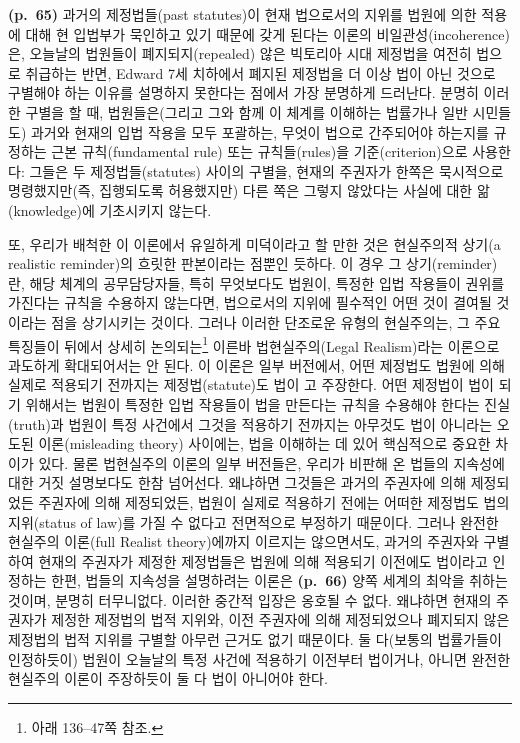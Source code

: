 \textbf{(p.~65)} 과거의 제정법들(past statutes)이 현재 법으로서의 지위를
법원에 의한 적용에 대해 현 입법부가 묵인하고 있기 때문에 갖게 된다는
이론의 비일관성(incoherence)은, 오늘날의 법원들이 폐지되지(repealed)
않은 빅토리아 시대 제정법을 여전히 법으로 취급하는 반면, Edward 7세
치하에서 폐지된 제정법을 더 이상 법이 아닌 것으로 구별해야 하는 이유를
설명하지 못한다는 점에서 가장 분명하게 드러난다. 분명히 이러한 구별을 할
때, 법원들은(그리고 그와 함께 이 체계를 이해하는 법률가나 일반 시민들도)
과거와 현재의 입법 작용을 모두 포괄하는, 무엇이 법으로 간주되어야
하는지를 규정하는 근본 규칙(fundamental rule) 또는 규칙들(rules)을
기준(criterion)으로 사용한다: 그들은 두 제정법들(statutes) 사이의
구별을, 현재의 주권자가 한쪽은 묵시적으로 명령했지만(즉, 집행되도록
허용했지만) 다른 쪽은 그렇지 않았다는 사실에 대한 앎(knowledge)에
기초시키지 않는다.

또, 우리가 배척한 이 이론에서 유일하게 미덕이라고 할 만한 것은
현실주의적 상기(a realistic reminder)의 흐릿한 판본이라는 점뿐인 듯하다.
이 경우 그 상기(reminder)란, 해당 체계의 공무담당자들, 특히 무엇보다도
법원이, 특정한 입법 작용들이  권위를 가진다는
규칙을 수용하지 않는다면, 법으로서의 지위에 필수적인 어떤 것이 결여될
것이라는 점을 상기시키는 것이다. 그러나 이러한 단조로운 유형의
현실주의는, 그 주요 특징들이 뒤에서 상세히 논의되는\footnote{아래
  136--47쪽 참조.} 이른바 법현실주의(Legal Realism)라는 이론으로
과도하게 확대되어서는 안 된다. 이 이론은 일부 버전에서, 어떤 제정법도
법원에 의해 실제로 적용되기 전까지는  제정법(statute)도
법이 고 주장한다. 어떤 제정법이 법이 되기 위해서는 법원이
특정한 입법 작용들이 법을 만든다는 규칙을 수용해야 한다는 진실(truth)과
법원이 특정 사건에서 그것을 적용하기 전까지는 아무것도 법이 아니라는
오도된 이론(misleading theory) 사이에는, 법을 이해하는 데 있어
핵심적으로 중요한 차이가 있다. 물론 법현실주의 이론의 일부 버전들은,
우리가 비판해 온 법들의 지속성에 대한 거짓 설명보다도 한참 넘어선다.
왜냐하면 그것들은 과거의 주권자에 의해 제정되었든  주권자에
의해 제정되었든, 법원이 실제로 적용하기 전에는 어떠한 제정법도 법의
지위(status of law)를 가질 수 없다고 전면적으로 부정하기 때문이다.
그러나 완전한 현실주의 이론(full Realist theory)에까지 이르지는
않으면서도, 과거의 주권자와 구별하여 현재의 주권자가 제정한 제정법들은
법원에 의해 적용되기 이전에도 법이라고 인정하는 한편, 법들의 지속성을
설명하려는 이론은 \textbf{(p.~66)} 양쪽 세계의 최악을 취하는 것이며,
분명히 터무니없다. 이러한 중간적 입장은 옹호될 수 없다. 왜냐하면 현재의
주권자가 제정한 제정법의 법적 지위와, 이전 주권자에 의해 제정되었으나
폐지되지 않은 제정법의 법적 지위를 구별할 아무런 근거도 없기 때문이다.
둘 다(보통의 법률가들이 인정하듯이) 법원이 오늘날의 특정 사건에 적용하기
이전부터 법이거나, 아니면 완전한 현실주의 이론이 주장하듯이 둘 다 법이
아니어야 한다.

